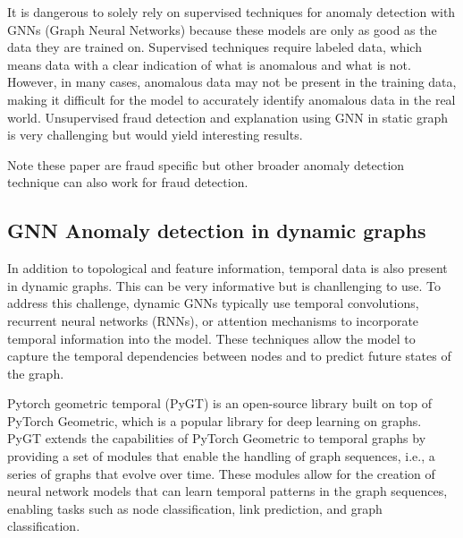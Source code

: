 It is dangerous to solely rely on supervised techniques for anomaly detection with GNNs (Graph Neural Networks) because these models are only as good as the data they are trained on. Supervised techniques require labeled data, which means data with a clear indication of what is anomalous and what is not. However, in many cases, anomalous data may not be present in the training data, making it difficult for the model to accurately identify anomalous data in the real world. Unsupervised fraud detection and explanation using GNN in static graph is very challenging but would yield interesting results.

Note these paper are fraud specific but other broader anomaly detection technique can also work for fraud detection.

\subsection{GNN Anomaly detection in dynamic graphs}

In addition to topological and feature information, temporal data is also present in dynamic graphs. This can be very informative but is chanllenging to use. To address this challenge, dynamic GNNs typically use temporal convolutions, recurrent neural networks (RNNs), or attention mechanisms to incorporate temporal information into the model. These techniques allow the model to capture the temporal dependencies between nodes and to predict future states of the graph.

Pytorch geometric temporal (PyGT) \cite{rozemberczki2021pytorch} is an open-source library built on top of PyTorch Geometric, which is a popular library for deep learning on graphs. PyGT extends the capabilities of PyTorch Geometric to temporal graphs by providing a set of modules that enable the handling of graph sequences, i.e., a series of graphs that evolve over time. These modules allow for the creation of neural network models that can learn temporal patterns in the graph sequences, enabling tasks such as node classification, link prediction, and graph classification.


